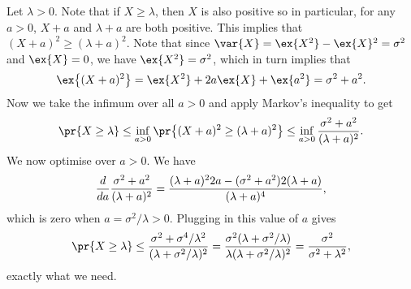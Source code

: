 \proof Let $\lambda > 0$. Note that if $X\ge \lambda$, then $X$ is also positive so in particular,
for any $a>0$, $X+a$ and $\lambda + a$ are both positive. This implies that $(X+a)^2\ge (\lambda+a)^2$.
Note that since $\var\{X\} = \ex\{X^2\} - \ex\{X\}^2 = \sigma^2$ and $\ex\{X\}=0$, we have
$\ex\{X^2\} = \sigma^2$, which in turn implies that
$$\ex\bigl\{(X+a)^2\bigr\} = \ex\{X^2\} + 2a\ex\{X\} + \ex\{a^2\} = \sigma^2+a^2.$$
Now we take the infimum over all $a>0$ and apply Markov's inequality to get
$$\pr\{X\ge\lambda\} \le \inf_{a > 0} \pr\bigl\{(X+a)^2 \ge (\lambda+a)^2\bigr\} \le
\inf_{a>0} {\sigma^2 + a^2\over (\lambda + a)^2}.$$
We now optimise over $a>0$. We have
$${d\over da} {\sigma^2 + a^2\over (\lambda + a)^2}
  = {(\lambda+a)^2 2a - (\sigma^2+a^2)2(\lambda+a)\over (\lambda + a)^4},$$
which is zero when $a = \sigma^2/\lambda > 0$. Plugging in this value of $a$ gives
$$\pr\{X\ge \lambda\} \le {\sigma^2 + \sigma^4/\lambda^2\over (\lambda + \sigma^2/\lambda)^2}
= {\sigma^2(\lambda + \sigma^2/\lambda) \over \lambda(\lambda + \sigma^2/\lambda)^2}
= {\sigma^2 \over \sigma^2+\lambda^2},$$
exactly what we need.\slug

\bye
